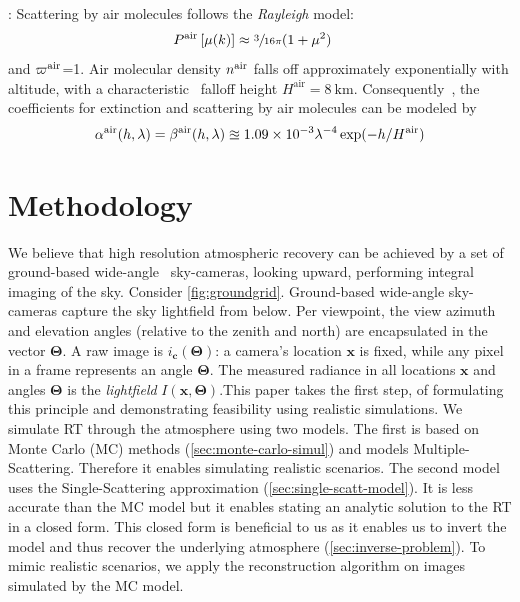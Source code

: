 \documentclass[10pt,letterpaper]{article}
\begin{document}
: Scattering by air molecules follows the
{\em Rayleigh} model:
\begin{align}
  P^{\rm air}\left[\mu(k)\right] &\approx \sfrac{3}{16\pi}(1+\mu^2)
  \label{eq:rayleighP}
\end{align}
and $\varpi^{\rm air}$=1. Air molecular density $n^{\rm air}$ falls
off approximately exponentially with altitude, with a
characteristic~\cite{Levi1980} falloff height $H^\mathrm{air}=8\
\si{\km}$. Consequently~\cite{Levi1980}, the coefficients for
extinction and scattering by air molecules can be modeled by
\begin{align}
  \alpha^{\rm air}(h, \lambda)=\beta^{\rm air}(h, \lambda) \approxeq
  1.09 \times 10^{-3}\lambda^{-4}
  \exp(-h/H^\mathrm{air}) %
  \label{eq:rayleighbeta}
\end{align}


\section{Methodology}
\label{sec:methodology}

We believe that high resolution atmospheric recovery can be achieved
by a set of ground-based wide-angle~\cite{Cossairt2011,
  Peleg01omnistereo:panoramic, Koppal:2011:WMS:2191740.2192152}
sky-cameras, looking upward, performing integral imaging of the sky.
Consider \cref{fig:groundgrid}.  Ground-based wide-angle sky-cameras
capture the sky lightfield from below. Per viewpoint, the view azimuth
and elevation angles (relative to the zenith and north) are
encapsulated in the vector ${\bm{\Theta}}$.  A raw image is $i_{\bm
  c}({\bm{\Theta}})$: a camera's location ${\bm x}$ is fixed, while
any pixel in a frame represents an angle ${\bm{\Theta}}$.  The
measured radiance in all locations ${\bm x}$ and angles
${\bm{\Theta}}$ is the {\em lightfield} $I({\bm
  x},{\bm{\Theta}})$.This paper takes the first step, of formulating
this principle and demonstrating feasibility using realistic
simulations.  We simulate RT through the atmosphere using two
models. The first is based on Monte Carlo (MC) methods
(\cref{sec:monte-carlo-simul}) and models
Multiple-Scattering. Therefore it enables simulating realistic
scenarios.  The second model uses the Single-Scattering approximation
(\cref{sec:single-scatt-model}). It is less accurate than the MC model
but it enables stating an analytic solution to the RT in a closed
form. This closed form is beneficial to us as it enables us to invert
the model and thus recover the underlying atmosphere
(\cref{sec:inverse-problem}). To mimic realistic scenarios, we apply
the reconstruction algorithm on images simulated by the MC model.
\end{document}
